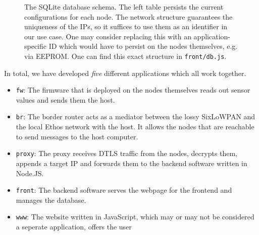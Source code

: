\documentclass[10pt, a4paper]{article}
\begin{document}
    \begin{figure}[!hbtp]
        \centering
        \caption{The SQLite database schema. The left table persists the current configurations for each node. The network structure guarantees the uniqueness of the IPs, so it suffices to use them as an identifier in our use case. One may consider replacing this with an application-specific ID which would have to persist on the nodes themselves, e.g. via EEPROM. One can find this exact structure in \texttt{front/db.js}.}
    \end{figure}

    In total, we have developed \emph{five} different applications which all work together.
    \begin{itemize}
        \item \texttt{fw}: The firmware that is deployed on the nodes themselves reads out sensor values and sends them the host.
        \item \texttt{br}: The border router acts as a mediator between the lossy SixLoWPAN and the local Ethos network with the host. It allows the nodes that are reachable to send messages to the host computer.
        \item \texttt{proxy}: The proxy receives DTLS traffic from the nodes, decrypts them, appends a target IP and forwards them to the backend software written in Node.JS.
        \item \texttt{front}: The backend software serves the webpage for the frontend and manages the database.
        \item \texttt{www}: The website written in JavaScript, which may or may not be considered a seperate application, offers the user
    \end{itemize}
\end{document}
